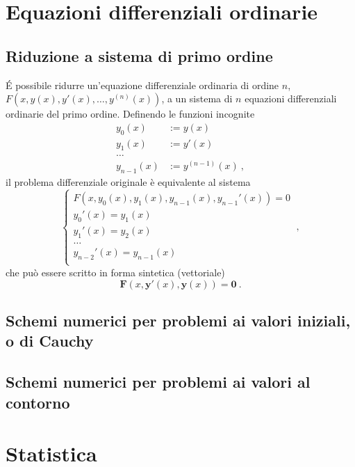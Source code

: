 \section{}

\chapter{Equazioni differenziali ordinarie}
\section{Riduzione a sistema di primo ordine}
\'E possibile ridurre un'equazione differenziale ordinaria di ordine $n$, $F(x,y(x),y'(x),\dots,y^{(n)}(x))$, a un sistema di $n$ equazioni differenziali ordinarie del primo ordine. Definendo le funzioni incognite
\begin{equation}
\begin{aligned}
    y_0(x) & := y(x) \\
    y_1(x) & := y'(x) \\
    \dots \\
    y_{n-1}(x) & := y^{(n-1)}(x) \ ,
\end{aligned}
\end{equation}
il problema differenziale originale è equivalente al sistema
\begin{equation}
    \begin{cases}
        F(x,y_0(x),y_1(x),y_{n-1}(x), y_{n-1}'(x)) = 0 \\
        y_0'(x) = y_1(x) \\
        y_1'(x) = y_2(x) \\
        \dots \\
        y_{n-2}'(x) = y_{n-1}(x) \\
    \end{cases} \ ,
\end{equation}
che può essere scritto in forma sintetica (vettoriale)
\begin{equation}
    \mathbf{F}(x, \mathbf{y}'(x), \mathbf{y}(x)) = \mathbf{0} \ .
\end{equation}

\section{Schemi numerici per problemi ai valori iniziali, o di Cauchy}
\section{Schemi numerici per problemi ai valori al contorno}

\chapter{Statistica}



